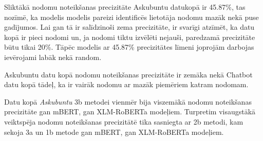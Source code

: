 Sliktākā nodomu noteikšanas precizitāte Askubuntu datukopā ir 45.87\%, tas nozīmē, ka modelis modelis pareizi identificēs lietotāja nodomu mazāk nekā puse gadījumos. Lai gan tā ir salīdzinoši zema precizitāte, ir svarīgi atzīmēt, ka datu kopā ir pieci nodomi un, ja nodomi tiktu izvēlēti nejauši, paredzamā precizitāte būtu tikai 20\%. Tāpēc modelis ar 45.87\% precizitātes līmeni joprojām darbojas ievērojami labāk nekā random.

Askubuntu datu kopā nodomu noteikšanas precizitāte ir zemāka nekā Chatbot datu kopā tādeļ, ka ir vairāk nodomu ar mazāk piemēriem katram nodomam.

Datu kopā \textit{Askubuntu} 3b metodei vienmēr bija viszemākā nodomu noteikšanas precizitāte gan mBERT, gan XLM-RoBERTa modeļiem. Turpretim visaugstākā veiktspēja nodomu noteikšanas precizitātē tika sasniegta ar 2b metodi, kam sekoja 3a un 1b metode gan mBERT, gan XLM-RoBERTa modeļiem.




